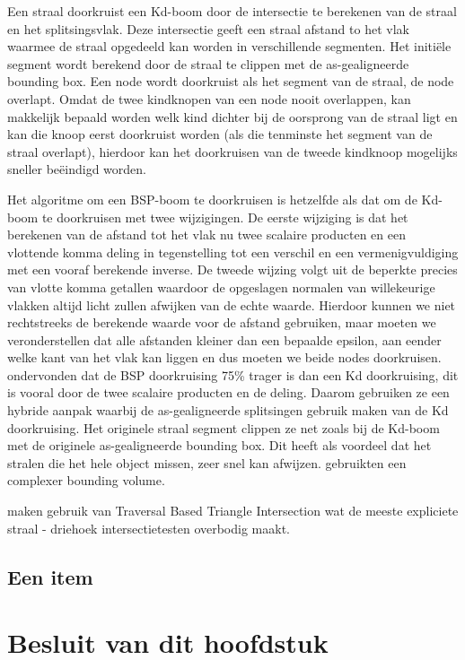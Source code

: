 Een straal doorkruist een Kd-boom door de intersectie te berekenen van de straal en het splitsingsvlak.  
Deze intersectie geeft een straal afstand to het vlak waarmee de straal opgedeeld kan worden in verschillende segmenten.
Het initiële segment wordt berekend door de straal te clippen met de as-gealigneerde bounding box. 
Een node wordt doorkruist als het segment van de straal, de node overlapt.
Omdat de twee kindknopen van een node nooit overlappen, kan makkelijk bepaald worden welk kind dichter bij de oorsprong van de straal ligt en kan die knoop eerst doorkruist worden (als die tenminste het segment van de straal overlapt), hierdoor kan het doorkruisen van de tweede kindknoop mogelijks sneller beëindigd worden. 

Het algoritme om een BSP-boom te doorkruisen is hetzelfde als dat om de Kd-boom te doorkruisen met twee wijzigingen.
De eerste wijziging is dat het berekenen van de afstand tot het vlak nu twee scalaire producten en een vlottende komma deling in tegenstelling tot een verschil en een vermenigvuldiging met een vooraf berekende inverse.
De tweede wijzing volgt uit de beperkte precies van vlotte komma getallen waardoor de opgeslagen normalen van willekeurige vlakken altijd licht zullen afwijken van de echte waarde.
Hierdoor kunnen we niet rechtstreeks de berekende waarde voor de afstand gebruiken, maar moeten we veronderstellen dat alle afstanden kleiner dan een bepaalde epsilon, aan eender welke kant van het vlak kan liggen en dus moeten we beide nodes doorkruisen.
\authorIze{ }ondervonden dat de BSP doorkruising 75\% trager is dan een Kd doorkruising, dit is vooral door de twee scalaire producten en de deling.
Daarom gebruiken ze een hybride aanpak waarbij de as-gealigneerde splitsingen gebruik maken van de Kd doorkruising.
Het originele straal segment clippen ze net zoals bij de Kd-boom met de originele as-gealigneerde bounding box.
Dit heeft als voordeel dat het stralen die het hele object missen, zeer snel kan afwijzen. 
\authorKammaje{ }gebruikten een complexer bounding volume.

\authorIze{ }maken gebruik van Traversal Based Triangle Intersection wat de meeste expliciete straal - driehoek intersectietesten overbodig maakt.

\subsection{Een item}

\section{Besluit van dit hoofdstuk}
